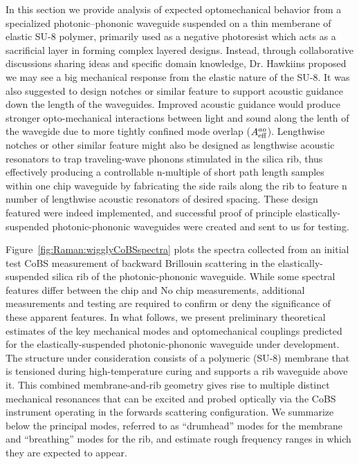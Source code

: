 In this section we provide analysis of expected optomechanical behavior from a specialized photonic--phononic waveguide suspended on a thin memberane of elastic SU-8 polymer, primarily used as a negative photoresist which acts as a sacrificial layer in forming complex layered designs. Instead, through collaborative discussions sharing ideas and specific domain knowledge, Dr. Hawkiins proposed we may see a big mechanical response from the elastic nature of the SU-8. It was also suggested to design notches or similar feature to support acoustic guidance down the length of the waveguides. Improved acoustic guidance would produce stronger opto-mechanical interactions between light and sound along the lenth of the wavegide due to more tightly confined mode overlap (\(A_{\rm eff}^{ao}\)). Lengthwise notches or other similar feature might also be designed as lengthwise acoustic resonators to trap traveling-wave phonons stimulated in the silica rib, thus effectively producing a controllable n-multiple of short path length samples within one chip waveguide by fabricating the side rails along the rib to feature n number of lengthwise acoustic resonators of desired spacing. These design featured were indeed implemented, and successful proof of principle elastically-suspended photonic-phononic waveguides were created and sent to us for testing.

Figure~\ref{fig:Raman:wigglyCoBSspectra} plots the spectra collected from an initial test \ac{CoBS} measurement of backward Brillouin scattering in the elastically-suspended silica rib of the photonic-phononic waveguide. While some spectral features differ between the chip and No chip measurements, additional measurements and testing are required to confirm or deny the significance of these apparent features. In what follows, we present preliminary theoretical estimates of the key mechanical modes and optomechanical couplings predicted for the elastically-suspended photonic-phononic waveguide under development. The structure under consideration consists of a polymeric (SU-8) membrane that is tensioned during high-temperature curing and supports a rib waveguide above it. This combined membrane-and-rib geometry gives rise to multiple distinct mechanical resonances that can be excited and probed optically via the \ac{CoBS} instrument operating in the forwards scattering configuration. We summarize below the principal modes, referred to as ``drumhead'' modes for the membrane and ``breathing'' modes for the rib, and estimate rough frequency ranges in which they are expected to appear.

